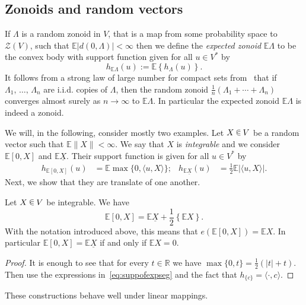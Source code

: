 \documentclass[AHL, Unicode, longabstracts, published]{cedram}
\newcommand{\R}{\mathbb{R}}
\newcommand{\EE}{\mathbb{E}}
\newcommand{\ZZ}{\mathscr{Z}}
\newcommand{\seg}{\underline}
\newcommand*\randin{
\mathchoice {\raisebox{-.35ex}{$\displaystyle{^\subset}$}\mkern-11.5mu\raisebox{+.45ex}{$\displaystyle{_\subset}$}} {\mkern+1mu\raisebox{-.27ex}{$\textstyle{^\subset}$}\mkern-11.7mu\raisebox{+.45ex}{$\textstyle{_\subset}$}} {\raisebox{.35ex}{$\scriptstyle\subset$}\mkern-14mu\raisebox{-.15ex}{$\scriptstyle\subset$}} {\raisebox{.3ex}{$\scriptscriptstyle\subset$}\mkern-13.5mu\raisebox{-.10ex}{$\scriptscriptstyle\subset$}}}
\begin{document}
\subsection{Zonoids and random vectors}\label{sec:zonandrv}

If $\Lambda$ is a random zonoid in $V$, that is a map from some probability space to $\ZZ(V)$, such that $\EE |d(0,\Lambda)|<\infty$ then we define the \emph{expected zonoid} $\EE\Lambda$ to be the convex body with support function given for all $u\in V^*$ by
\begin{equation*}
h_{\EE\Lambda}(u):=\EE\left\{ h_\Lambda(u)\right\}.
\end{equation*}
It follows from a strong law of large number for compact sets from~\cite{ArsVit} that if $\Lambda_1,\,\ldots,\,\Lambda_n$ are i.i.d. copies of $\Lambda$, then the random zonoid $\tfrac{1}{n}(\Lambda_1+\cdots+\Lambda_n)$ converges almost surely as $n\to\infty$ to $\EE\Lambda$. In particular the expected zonoid $\EE\Lambda$ is indeed a zonoid.

We will, in the following, consider mostly two examples. Let $X\,\randin\, V$ be a random vector such that $\EE\|X\|<\infty$. We say that $X$ is \emph{integrable} and we consider $\EE[0,X]$ and $\EE\seg{X}$. Their support function is given for all $u\in V^*$ by
\begin{align}\label{eq:suppofexpseg}
h_{\EE[0,X]}(u)&=\EE\max\{0,\langle u, X\rangle\};& h_{\EE\seg{X}}(u)&=\frac{1}{2}\EE|\langle u, X\rangle|.
\end{align}
Next, we show that they are translate of one another.

\begin{lemm}\label{lem:centnotcent}
Let $X\,\randin\, V$ be integrable. We have
\begin{equation*}
\EE[0,X]=\EE\seg{X}+\frac{1}{2}\left\{\EE X\right\}.
\end{equation*}
With the notation introduced above, this means that $e(\EE[0,X])=\EE X$. In particular $\EE[0,X]=\EE\seg{X}$ if and only if $\EE X=0$.
\end{lemm}

\begin{proof}
It is enough to see that for every $t\in \R$ we have $\max\{0,t\}=\tfrac{1}{2}(|t|+t)$. Then use the expressions in~\eqref{eq:suppofexpseg} and the fact that $h_{\{c\}}=\langle\cdot,c\rangle$.
\end{proof}

These constructions behave well under linear mappings.
\end{document}
